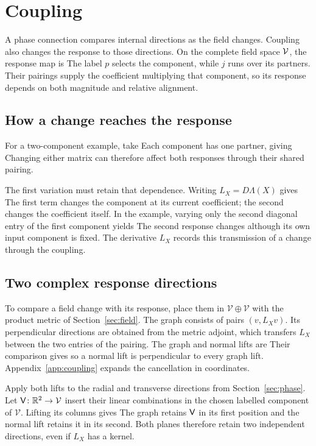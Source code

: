 \section{Coupling}
\label{sec:coupling}
A phase connection compares internal directions as the field changes. Coupling also changes the response to those directions. On the complete field space ${\mathcal V}$, the response map is
\CouplingCouplingDisplay
The label $p$ selects the component, while $j$ runs over its partners. Their pairings supply the coefficient multiplying that component, so its response depends on both magnitude and relative alignment.

\subsection{How a change reaches the response}
For a two-component example, take
\CouplingMatrixInputExampleDisplay
Each component has one partner, giving
\CouplingMatrixResponseExampleDisplay
Changing either matrix can therefore affect both responses through their shared pairing.

The first variation must retain that dependence. Writing $L_X=D\Lambda(X)$ gives
\CouplingCouplingResponseDisplay
The first term changes the component at its current coefficient; the second changes the coefficient itself. In the example, varying only the second diagonal entry of the first component yields
\CouplingMatrixVariationExampleDisplay
The second response changes although its own input component is fixed. The derivative $L_X$ records this transmission of a change through the coupling.

\subsection{Two complex response directions}
To compare a field change with its response, place them in $\mathcal V\oplus\mathcal V$ with the product metric of Section~\ref{sec:field}. The graph consists of pairs $(v,L_Xv)$. Its perpendicular directions are obtained from the metric adjoint,
\CouplingAdjointMeaningDisplay
which transfers $L_X$ between the two entries of the pairing. The graph and normal lifts are
\CouplingPairLiftDisplay
Their comparison gives
\CouplingPairOrthogonalityDisplay
so a normal lift is perpendicular to every graph lift. Appendix~\ref{app:coupling} expands the cancellation in coordinates.

Apply both lifts to the radial and transverse directions from Section~\ref{sec:phase}. Let ${\mathsf V}\colon\mathbb R^2\to {\mathcal V}$ insert their linear combinations in the chosen labelled component of $\mathcal V$. Lifting its columns gives
\CouplingPairColumnsDisplay
The graph retains ${\mathsf V}$ in its first position and the normal lift retains it in its second. Both planes therefore retain two independent directions, even if $L_X$ has a kernel.

